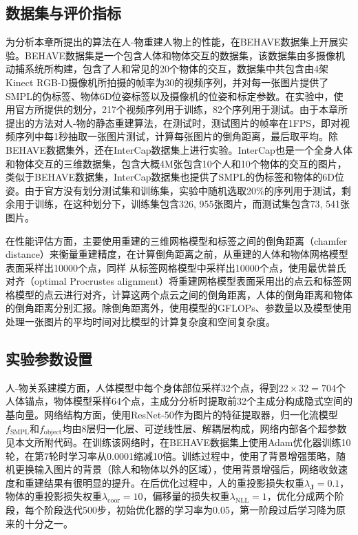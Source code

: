 \subsection{数据集与评价指标}
为分析本章所提出的算法在人-物重建人物上的性能，在BEHAVE数据集上开展实验。BEHAVE数据集\citep{Bhatnagar_2022_CVPR:BEHAVE}是一个包含人体和物体交互的数据集，该数据集由多摄像机动捕系统所构建，包含了人和常见的20个物体的交互，数据集中共包含由4架Kinect RGB-D摄像机所拍摄的帧率为30的视频序列，并对每一张图片提供了SMPL的伪标签、物体6D位姿标签以及摄像机的位姿和标定参数。在实验中，使用官方所提供的划分，217个视频序列用于训练，82个序列用于测试。由于本章所提出的方法对人-物的静态重建算法，在测试时，测试图片的帧率在1FPS，即对视频序列中每1秒抽取一张图片测试，计算每张图片的倒角距离，最后取平均。除BEHAVE数据集外，还在InterCap数据集上进行实验。InterCap也是一个全身人体和物体交互的三维数据集，包含大概4M张包含10个人和10个物体的交互的图片，类似于BEHAVE数据集，InterCap数据集也提供了SMPL的伪标签和物体的6D位姿。由于官方没有划分测试集和训练集，实验中随机选取20\%的序列用于测试，剩余用于训练，在这种划分下，训练集包含326, 955张图片，而测试集包含73, 541张图片。

在性能评估方面，主要使用重建的三维网格模型和标签之间的倒角距离（chamfer distance）来衡量重建精度，在计算倒角距离之前，从重建的人体和物体网格模型表面采样出10000个点，同样 从标签网格模型中采样出10000个点，使用最优普氏对齐（optimal  Procrustes alignment）将重建网格模型表面采用出的点云和标签网格模型的点云进行对齐，计算这两个点云之间的倒角距离，人体的倒角距离和物体的倒角距离分别汇报。除倒角距离外，使用模型的GFLOPs、参数量以及模型使用处理一张图片的平均时间对比模型的计算复杂度和空间复杂度。

\subsection{实验参数设置}
人-物关系建模方面，人体模型中每个身体部位采样32个点，得到$22 \times 32 = 704$个人体锚点，物体模型采样64个点，主成分分析时提取前32个主成分构成隐式空间的基向量。网络结构方面，使用ResNet-50作为图片的特征提取器，归一化流模型$f_{\text{SMPL}}$和$f_{\text{object}}$均由8层归一化层、可逆线性层、解耦层构成，网络内部各个超参数见本文所附代码。在训练该网络时，在BEHAVE数据集上使用Adam优化器训练10轮，在第7轮时学习率从0.0001缩减10倍。训练过程中，使用了背景增强策略，随机更换输入图片的背景（除人和物体以外的区域），使用背景增强后，网络收敛速度和重建结果有很明显的提升。在后优化过程中，人的重投影损失权重$\lambda_{\mathbf{J}}=0.1$，物体的重投影损失权重$\lambda_{\text{coor}}=10$，偏移量的损失权重$\lambda_{\text{NLL}}=1$，优化分成两个阶段，每个阶段迭代500步，初始优化器的学习率为0.05，第一阶段过后学习降为原来的十分之一。

